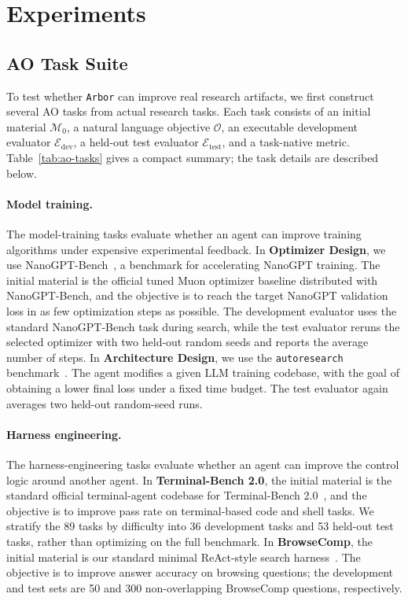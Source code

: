 \documentclass{llmxive}
\providecommand{\arbor}{\texttt{Arbor}}
\providecommand{\Mat}{\mathcal{M}}
\providecommand{\Obj}{\mathcal{O}}
\providecommand{\Eval}{\mathcal{E}}
\providecommand{\dev}{\mathrm{dev}}
\providecommand{\test}{\mathrm{test}}
\begin{document}
\FloatBarrier

\section{Experiments}
\label{sec:experiments}

\subsection{AO Task Suite}
\label{sec:ao-task-suite}

To test whether \arbor{} can improve real research artifacts, we first construct
several AO tasks from actual research tasks. Each task consists of an initial
material $\Mat_0$, a natural language objective $\Obj$, an executable
development evaluator $\Eval_{\dev}$, a held-out test evaluator $\Eval_{\test}$,
and a task-native metric. Table~\ref{tab:ao-tasks} gives a compact summary; the
task details are described below.

\paragraph{Model training.}
The model-training tasks evaluate whether an agent can improve training
algorithms under expensive experimental feedback. In \textbf{Optimizer Design},
we use NanoGPT-Bench~\citep{nanogptbench}, a benchmark for accelerating
NanoGPT training. The initial material is the official tuned Muon optimizer
baseline distributed with NanoGPT-Bench, and the objective is to reach the
target NanoGPT validation loss in as few optimization steps as possible. The
development evaluator uses the standard NanoGPT-Bench task during search, while
the test evaluator reruns the selected optimizer with two held-out random seeds
and reports the average number of steps. In \textbf{Architecture Design}, we use
the \texttt{autoresearch} benchmark~\citep{autoresearch}. The agent modifies a
given LLM training codebase, with the goal of obtaining a lower final loss under
a fixed time budget. The test evaluator again averages two held-out random-seed
runs.

\paragraph{Harness engineering.}
The harness-engineering tasks evaluate whether an agent can improve the control
logic around another agent. In \textbf{Terminal-Bench 2.0}, the initial material
is the standard official terminal-agent codebase for Terminal-Bench
2.0~\citep{terminalbench}, and the objective is to improve pass rate on
terminal-based code and shell tasks. We stratify the 89 tasks by difficulty into
36 development tasks and 53 held-out test tasks, rather than optimizing on the
full benchmark. In \textbf{BrowseComp}, the initial material is our standard
minimal ReAct-style search harness~\citep{react,browsecomp}. The objective is to
improve answer accuracy on browsing questions; the development and test sets are
50 and 300 non-overlapping BrowseComp questions, respectively.
\end{document}
